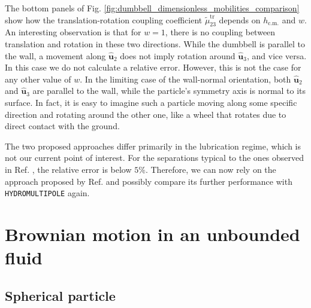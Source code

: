 \documentclass{master_thesis}
\def\code#1{\texttt{#1}}
\begin{document}
The bottom panels of Fig. \ref{fig:dumbbell_dimensionless_mobilities_comparison} show how the translation-rotation coupling coefficient $\tilde{\mu}^{\textrm{tr}}_{23}$ depends on $h_{\textrm{c.m.}}$ and $w$. An interesting observation is that for $w=1$, there is no coupling between translation and rotation in these two directions. While the dumbbell is parallel to the wall, a movement along $\hat{\boldsymbol{u}}_2$ does not imply rotation around $\hat{\boldsymbol{u}}_3$, and vice versa. In this case we do not calculate a relative error. However, this is not the case for any other value of $w$. In the limiting case of the wall-normal orientation, both $\hat{\boldsymbol{u}}_2$ and $\hat{\boldsymbol{u}}_3$ are parallel to the wall, while the particle's symmetry axis is normal to its surface. In fact, it is easy to imagine such a particle moving along some specific direction and rotating around the other one, like a wheel that rotates due to direct contact with the ground.

The two proposed approaches differ primarily in the lubrication regime, which is not our current point of interest. For the separations typical to the ones observed in Ref. \cite{verweij2021}, the relative error is below $5\%$. Therefore, we can now rely on the approach proposed by Ref. \cite{lisicki2016} and possibly compare its further performance with \code{HYDROMULTIPOLE} again.

\section{Brownian motion in an unbounded fluid} \label{sec:unbounded_results}

\subsection{Spherical particle} \label{sec:unbounded_results_sphere}
\end{document}
